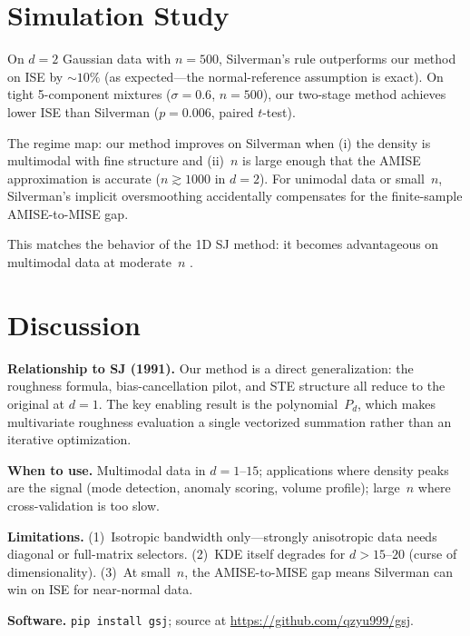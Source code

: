 \documentclass[12pt]{article}
\begin{document}
\section{Simulation Study}
\label{sec:simulations}

On $d{=}2$ Gaussian data with $n{=}500$, Silverman's rule outperforms our method on ISE by ${\sim}10\%$ (as expected---the normal-reference assumption is exact). On tight 5-component mixtures ($\sigma{=}0.6$, $n{=}500$), our two-stage method achieves lower ISE than Silverman ($p{=}0.006$, paired $t$-test).

The regime map: our method improves on Silverman when (i) the density is multimodal with fine structure and (ii)~$n$ is large enough that the AMISE approximation is accurate ($n \gtrsim 1000$ in $d{=}2$). For unimodal data or small~$n$, Silverman's implicit oversmoothing accidentally compensates for the finite-sample AMISE-to-MISE gap.

This matches the behavior of the 1D SJ method: it becomes advantageous on multimodal data at moderate~$n$ \citep{jones1996brief}.

\section{Discussion}
\label{sec:discussion}

\textbf{Relationship to SJ (1991).} Our method is a direct generalization: the roughness formula, bias-cancellation pilot, and STE structure all reduce to the original at $d{=}1$. The key enabling result is the polynomial~$P_d$, which makes multivariate roughness evaluation a single vectorized summation rather than an iterative optimization.

\textbf{When to use.} Multimodal data in $d=1$--$15$; applications where density peaks are the signal (mode detection, anomaly scoring, volume profile); large~$n$ where cross-validation is too slow.

\textbf{Limitations.} (1)~Isotropic bandwidth only---strongly anisotropic data needs diagonal or full-matrix selectors. (2)~KDE itself degrades for $d>15$--$20$ (curse of dimensionality). (3)~At small~$n$, the AMISE-to-MISE gap means Silverman can win on ISE for near-normal data.

\textbf{Software.} \texttt{pip install gsj}; source at \url{https://github.com/qzyu999/gsj}.
\end{document}
